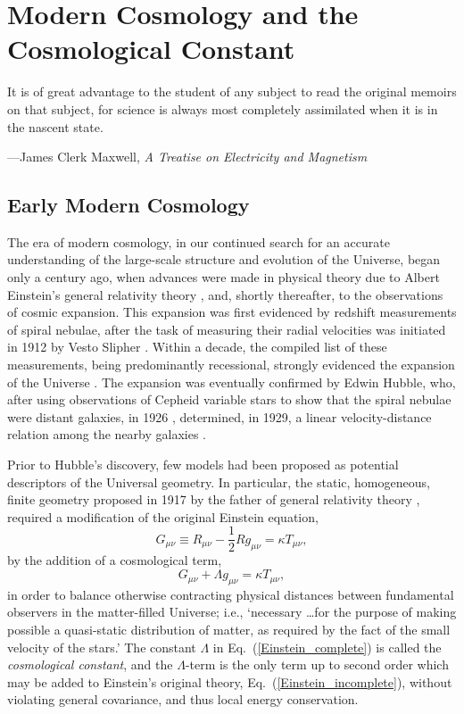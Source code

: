\chapter[Modern Cosmology and the Cosmological Constant]{Modern Cosmology and the\\Cosmological Constant\label{chap_MCCC}}
\epigraph{It is of great advantage to the student of any subject to read the original memoirs on that subject, for science is always most completely assimilated when it is in the nascent state.}{---James Clerk Maxwell, \textit{A Treatise on Electricity and Magnetism}}
\section{Early Modern Cosmology\label{sec_EMC}}
The era of modern cosmology, in our continued search for an accurate understanding of the large-scale structure and evolution of the Universe, began only a century ago, when advances were made in physical theory due to Albert Einstein's general relativity theory \cite{Einstein1915,Einstein1952}, and, shortly thereafter, to the observations of cosmic expansion. This expansion was first evidenced by redshift measurements of spiral nebulae, after the task of measuring their radial velocities was initiated in 1912 by Vesto Slipher \cite{Slipher1913}. Within a decade, the compiled list of these measurements, being predominantly recessional, strongly evidenced the expansion of the Universe \cite{Eddington1923}. The expansion was eventually confirmed by Edwin Hubble, who, after using observations of Cepheid variable stars to show that the spiral nebulae were distant galaxies, in 1926 \cite{Hubble1926a,Hubble1926b}, determined, in 1929, a linear velocity-distance relation among the nearby galaxies \cite{Hubble1929}. 

Prior to Hubble's discovery, few models had been proposed as potential descriptors of the Universal geometry. In particular, the static, homogeneous, finite geometry proposed in 1917 by the father of general relativity theory \cite{Einstein1917,Einstein1952}, required a modification of the original Einstein equation,
\begin{equation}
G_{\mu\nu}\equiv{R_{\mu\nu}}-\frac{1}{2}Rg_{\mu\nu}=\kappa{T_{\mu\nu}},\label{Einstein_incomplete}
\end{equation}
by the addition of a cosmological term,
\begin{equation}
G_{\mu\nu}+\Lambda{g_{\mu\nu}}=\kappa{T_{\mu\nu}},\label{Einstein_complete}
\end{equation}
in order to balance otherwise contracting physical distances between fundamental observers in the matter-filled Universe; i.e., `necessary \ldots for the purpose of making possible a quasi-static distribution of matter, as required by the fact of the small velocity of the stars.' The constant $\Lambda$ in Eq.~(\ref{Einstein_complete}) is called the \textit{cosmological constant}, and the $\Lambda$-term is the only term up to second order which may be added to Einstein's original theory, Eq.~(\ref{Einstein_incomplete}), without violating general covariance, and thus local energy conservation.


